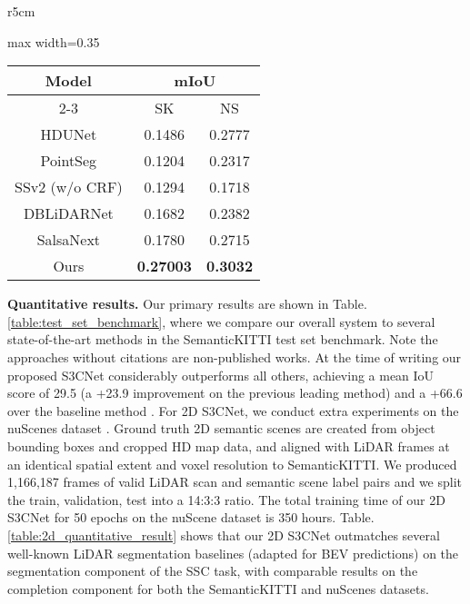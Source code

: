 \documentclass{article}
\begin{document}
\begin{wraptable}{r}{5cm}
\centering
\begin{adjustbox}{max width=0.35\textwidth}
\begin{tabular}{|c|c|c|}
\hline
\multirow{2}{*}{Model}                     & \multicolumn{2}{c|}{mIoU}     \\  \cline{2-3} 
                                           & SK               & NS               \\ \hline
HDUNet \cite{yang2018hdnet}                & 0.1486           & 0.2777           \\
PointSeg \cite{wang2018pointseg}           & 0.1204           & 0.2317           \\
SSv2 (w/o CRF) \cite{wu2019squeezesegv2}   & 0.1294           & 0.1718           \\
DBLiDARNet \cite{dewan2019deeptemporalseg} & 0.1682           & 0.2382           \\
SalsaNext \cite{cortinhal2020salsanext}    & 0.1780           & 0.2715           \\ \hline
Ours                                       & \textbf{0.27003} & \textbf{ 0.3032} \\ \hline
\end{tabular}
\end{adjustbox}
\captionsetup{font=scriptsize,labelfont=scriptsize}
\caption{2D S3CNet quantitative results and comparison to state-of-the-art on SemanticKITTI validation set (SK) and nuScenes test set (NS). \cite{caesar2020nuscenes})}
\label{table:2d_quantitative_result}
\vspace{-10px}
\end{wraptable}

\textbf{Quantitative results.} Our primary results are shown in Table. \ref{table:test_set_benchmark}, where we compare our overall system to several state-of-the-art methods in the SemanticKITTI test set benchmark. Note the approaches without citations are non-published works. At the time of writing our proposed S3CNet considerably outperforms all others, achieving a mean IoU score of 29.5 (a +23.9 improvement on the previous leading method) and a +66.6 over the baseline method \cite{behley2019semantickitti}. For 2D S3CNet, we conduct extra experiments on the nuScenes dataset \cite{caesar2020nuscenes}. Ground truth 2D semantic scenes are created from object bounding boxes and cropped HD map data, and aligned with LiDAR frames at an identical spatial extent and voxel resolution to SemanticKITTI. We produced 1,166,187 frames of valid LiDAR scan and semantic scene label pairs and we split the train, validation, test into a 14:3:3 ratio. The total training time of our 2D S3CNet for 50 epochs on the nuScene dataset is 350 hours. Table. \ref{table:2d_quantitative_result} shows that our 2D S3CNet outmatches several well-known LiDAR segmentation baselines (adapted for BEV predictions) on the segmentation component of the SSC task, with comparable results on the completion component for both the SemanticKITTI and nuScenes datasets.
\end{document}
